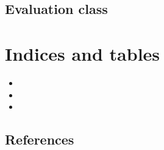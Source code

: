 \documentclass[letterpaper,10pt,english,openany,oneside]{sphinxmanual}
\begin{document}
\section{Evaluation class}
\label{\detokenize{Evaluation:evaluation-class}}\label{\detokenize{Evaluation::doc}}

\chapter{Indices and tables}
\label{\detokenize{index:indices-and-tables}}\begin{itemize}
\item {} 

\item {} 

\item {} 

\end{itemize}


\section{References}
\label{\detokenize{index:references}}


\renewcommand{\indexname}{Index}
\printindex
\end{document}
